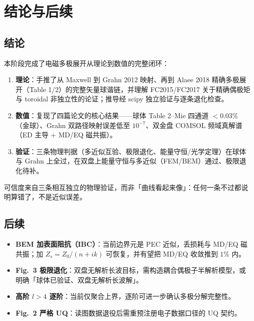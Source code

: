 \section{结论与后续}

\subsection{结论}

本阶段完成了电磁多极展开从理论到数值的完整闭环：

\begin{enumerate}
  \item \textbf{理论}：手推了从 Maxwell 到 Grahn 2012 映射、再到 Alaee 2018 精确多极展开（Table 1/2）的完整矢量球谐链，并理解 FC2015/FC2017 关于精确偶极矩与 toroidal 非独立性的论证；推导经 scipy 独立验证与逐条退化检查。
  \item \textbf{数值}：复现了四篇论文的核心结果——球体 Table 2--Mie 四通道 $<0.03\%$（金球）、Grahn 双路径映射误差低至 $10^{-7}$、双金盘 COMSOL 频域真解谱（ED 主导 + MD/EQ 磁共振）。
  \item \textbf{验证}：三条物理判据（多近似互验、极限退化、能量守恒/光学定理）在球体与 Grahn 上全过，在双盘上能量守恒与多近似（FEM/BEM）通过、极限退化待补。
\end{enumerate}

可信度来自三条相互独立的物理验证，而非「曲线看起来像」：任何一条不过都说明算错了，不是近似误差。

\subsection{后续}

\begin{itemize}
  \item \textbf{BEM 加表面阻抗（IBC）}：当前边界元是 PEC 近似，丢损耗与 MD/EQ 磁共振；加 $Z_s=Z_0/(n+ik)$ 可恢复，并有望把 MD/EQ 收敛推到 $1\%$ 内。
  \item \textbf{Fig.~3 极限退化}：双盘无解析长波目标，需构造耦合偶极子半解析模型，或明确「球体已验证、双盘无解析长波解」。
  \item \textbf{高阶 $l>4$ 逐阶}：当前仅聚合上界，逐阶可进一步确认多极分解完整性。
  \item \textbf{Fig.~2 严格 UQ}：读图数据退役后需重预注册电子数据口径的 UQ 契约。
\end{itemize}
